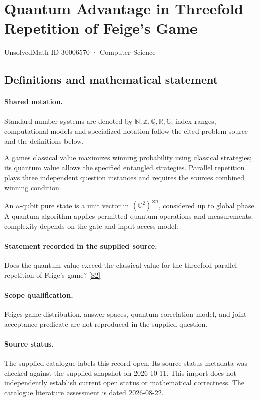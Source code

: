 \documentclass[11pt]{article}
\newcommand{\sref}[2]{\hyperlink{source:#1:#2}{[S#2]}}
\begin{document}
\setcounter{section}{30006569}
\section{Quantum Advantage in Threefold Repetition of Feige’s Game}\label{30006570}
{\small\sffamily UnsolvedMath ID 30006570 · Computer Science}
\subsection{Definitions and mathematical statement}

\paragraph{Shared notation.}Standard number systems are denoted by $\mathbb N,\mathbb Z,\mathbb Q,\mathbb R,\mathbb C$; index ranges, computational models and specialized notation follow the cited problem source and the definitions below.


A game\textquotesingle s classical value maximizes winning probability using classical strategies; its quantum value allows the specified entangled strategies. Parallel repetition plays three independent question instances and requires the source\textquotesingle s combined winning condition.

An $n$-qubit pure state is a unit vector in $(\mathbb C^2)^{\otimes n}$, considered up to global phase. A quantum algorithm applies permitted quantum operations and measurements; complexity depends on the gate and input-access model.
\paragraph{Statement recorded in the supplied source.}
Does the quantum value exceed the classical value for the threefold parallel repetition of Feige’s game? \sref{30006570}{2}
\paragraph{Scope qualification.}
Feige\textquotesingle s game distribution, answer spaces, quantum correlation model, and joint acceptance predicate are not reproduced in the supplied question.
\paragraph{Source status.}
The supplied catalogue labels this record open. Its source-status metadata was checked against the supplied snapshot on 2026-10-11. This import does not independently establish current open status or mathematical correctness. The catalogue literature assessment is dated 2026-08-22.
\end{document}
